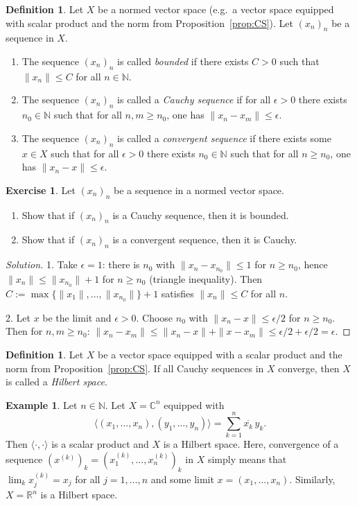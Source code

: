 \documentclass[11pt,a4paper]{article}
\numberwithin{equation}{section}
\newcommand{\N}{\mathbb{N}}
\newcommand{\R}{\mathbb{R}}
\newcommand{\C}{\mathbb{C}}
\newcommand{\ip}[2]{\langle #1, #2\rangle}
\newcommand{\conj}[1]{\overline{#1}}
\theoremstyle{plain}
\theoremstyle{definition}
\newtheorem{definition}[theorem]{Definition}
\newtheorem{example}[theorem]{Example}
\newtheorem{exercise}[theorem]{Exercise}
\theoremstyle{plain}
\theoremstyle{definition}
\newenvironment{solution}{\begin{proof}[Solution]}{\end{proof}}
\begin{document}
\begin{definition}
Let $X$ be a normed vector space (e.g.\ a vector space equipped with scalar product and
the norm from Proposition~\ref{prop:CS}). Let $(x_n)_n$ be a sequence in $X$.
\begin{enumerate}
\item The sequence $(x_n)_n$ is called \emph{bounded} if there exists $C>0$ such that
      $\|x_n\|\le C$ for all $n\in\N$.
\item The sequence $(x_n)_n$ is called a \emph{Cauchy sequence} if for all $\epsilon>0$ there
      exists $n_0\in\N$ such that for all $n,m\geqslant n_0$, one has $\|x_n-x_m\|\leqslant\epsilon$.
\item The sequence $(x_n)_n$ is called a \emph{convergent sequence} if there exists some
      $x\in X$ such that for all $\epsilon>0$ there exists $n_0\in\N$ such that for all
      $n\geqslant n_0$, one has $\|x_n-x\|\leqslant\epsilon$.
\end{enumerate}
\end{definition}

\begin{exercise}
Let $(x_n)_n$ be a sequence in a normed vector space.
\begin{enumerate}
\item Show that if $(x_n)_n$ is a Cauchy sequence, then it is bounded.
\item Show that if $(x_n)_n$ is a convergent sequence, then it is Cauchy.
\end{enumerate}
\end{exercise}
\begin{solution}
1. Take $\epsilon=1$: there is $n_0$ with $\|x_n-x_{n_0}\|\le1$ for $n\ge n_0$, hence
$\|x_n\|\le\|x_{n_0}\|+1$ for $n\ge n_0$ (triangle inequality). Then
$C:=\max\{\|x_1\|,\dots,\|x_{n_0}\|\}+1$ satisfies $\|x_n\|\le C$ for all $n$.

2. Let $x$ be the limit and $\epsilon>0$. Choose $n_0$ with $\|x_n-x\|\le\epsilon/2$ for
$n\ge n_0$. Then for $n,m\ge n_0$:
$\|x_n-x_m\|\le\|x_n-x\|+\|x-x_m\|\le\epsilon/2+\epsilon/2=\epsilon$.
\end{solution}

\begin{definition}
Let $X$ be a vector space equipped with a scalar product and the norm from
Proposition~\ref{prop:CS}. If all Cauchy sequences in $X$ converge, then $X$ is called a
\emph{Hilbert space}.
\end{definition}

\begin{example}\label{ex:Cn}
Let $n\in\N$. Let $X=\C^n$ equipped with
\[
\ip{(x_1,\dots,x_n)}{(y_1,\dots,y_n)}=\sum_{k=1}^n\conj{x_k}\,y_k .
\]
Then $\ip{\cdot}{\cdot}$ is a scalar product and $X$ is a Hilbert space. Here, convergence
of a sequence $(x^{(k)})_k=(x_1^{(k)},\dots,x_n^{(k)})_k$ in $X$ simply means that
$\lim_kx_j^{(k)}=x_j$ for all $j=1,\dots,n$ and some limit $x=(x_1,\dots,x_n)$. Similarly,
$X=\R^n$ is a Hilbert space.
\end{example}
\end{document}
